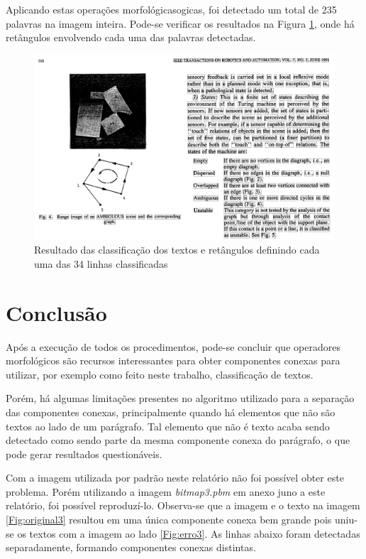 \documentclass{article}
\begin{document}
Aplicando estas operações morfológicasogicas, foi detectado um total de 235 palavras na imagem inteira. Pode-se verificar os resultados na Figura \ref{Fig:border_words}, onde há retângulos envolvendo cada uma das palavras detectadas.

\begin{figure}[!htb]
  \centering
  \includegraphics[width=.8\linewidth]{res/bitmap/img_border_words.png}
  \caption{Resultado das classificação dos textos e retângulos definindo cada uma das 34 linhas classificadas}\label{Fig:border_words}
\end{figure}

\section{Conclusão}

Após a execução de todos os procedimentos, pode-se concluir que operadores morfológicos são recursos interessantes para obter componentes conexas para utilizar, por exemplo como feito neste trabalho, classificação de textos.

Porém, há algumas limitações presentes no algoritmo utilizado para a separação das componentes conexas, principalmente quando há elementos que não são textos ao lado de um parágrafo. Tal elemento que não é texto acaba sendo detectado como sendo parte da mesma componente conexa do parágrafo, o que pode gerar resultados questionáveis.

Com a imagem utilizada por padrão neste relatório não foi possível obter este problema. Porém utilizando a imagem \textit{bitmap3.pbm} em anexo juno a este relatório, foi possível reproduzí-lo. Observa-se que a imagem e o texto na imagem \ref{Fig:original3} resultou em uma única componente conexa bem grande pois uniu-se os textos com a imagem ao lado \ref{Fig:erro3}. As linhas abaixo foram detectadas separadamente, formando componentes conexas distintas.
\end{document}
